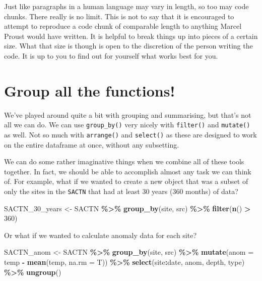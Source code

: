 \documentclass[
]{book}
\newenvironment{Shaded}{\begin{snugshade}}{\end{snugshade}}
\newcommand{\DataTypeTok}[1]{\textcolor[rgb]{0.13,0.29,0.53}{#1}}
\newcommand{\DecValTok}[1]{\textcolor[rgb]{0.00,0.00,0.81}{#1}}
\newcommand{\KeywordTok}[1]{\textcolor[rgb]{0.13,0.29,0.53}{\textbf{#1}}}
\newcommand{\NormalTok}[1]{#1}
\newcommand{\OperatorTok}[1]{\textcolor[rgb]{0.81,0.36,0.00}{\textbf{#1}}}
\newcommand{\StringTok}[1]{\textcolor[rgb]{0.31,0.60,0.02}{#1}}
\begin{document}
Just like paragraphs in a human language may vary in length, so too may code chunks. There really is no limit. This is not to say that it is encouraged to attempt to reproduce a code chunk of comparable length to anything Marcel Proust would have written. It is helpful to break things up into pieces of a certain size. What that size is though is open to the discretion of the person writing the code. It is up to you to find out for yourself what works best for you.

\hypertarget{group-all-the-functions}{%
\section{Group all the functions!}\label{group-all-the-functions}}

We've played around quite a bit with grouping and summarising, but that's not all we can do. We can use \texttt{group\_by()} very nicely with \texttt{filter()} and \texttt{mutate()} as well. Not so much with \texttt{arrange()} and \texttt{select()} as these are designed to work on the entire dataframe at once, without any subsetting.

We can do some rather imaginative things when we combine all of these tools together. In fact, we should be able to accomplish almost any task we can think of. For example, what if we wanted to create a new object that was a subset of only the sites in the \texttt{SACTN} that had at least 30 years (360 months) of data?

\begin{Shaded}
\begin{Highlighting}[]
\NormalTok{SACTN\_}\DecValTok{30}\NormalTok{\_years <{-}}\StringTok{ }\NormalTok{SACTN }\OperatorTok{\%>\%}
\StringTok{  }\KeywordTok{group\_by}\NormalTok{(site, src) }\OperatorTok{\%>\%}
\StringTok{  }\KeywordTok{filter}\NormalTok{(}\KeywordTok{n}\NormalTok{() }\OperatorTok{>}\StringTok{ }\DecValTok{360}\NormalTok{)}
\end{Highlighting}
\end{Shaded}

Or what if we wanted to calculate anomaly data for each site?

\begin{Shaded}
\begin{Highlighting}[]
\NormalTok{SACTN\_anom <{-}}\StringTok{ }\NormalTok{SACTN }\OperatorTok{\%>\%}
\StringTok{  }\KeywordTok{group\_by}\NormalTok{(site, src) }\OperatorTok{\%>\%}\StringTok{ }
\StringTok{  }\KeywordTok{mutate}\NormalTok{(}\DataTypeTok{anom =}\NormalTok{ temp }\OperatorTok{{-}}\StringTok{ }\KeywordTok{mean}\NormalTok{(temp, }\DataTypeTok{na.rm =}\NormalTok{ T)) }\OperatorTok{\%>\%}\StringTok{ }
\StringTok{  }\KeywordTok{select}\NormalTok{(site}\OperatorTok{:}\NormalTok{date, anom, depth, type) }\OperatorTok{\%>\%}\StringTok{ }
\StringTok{  }\KeywordTok{ungroup}\NormalTok{()}
\end{Highlighting}
\end{Shaded}
\end{document}
